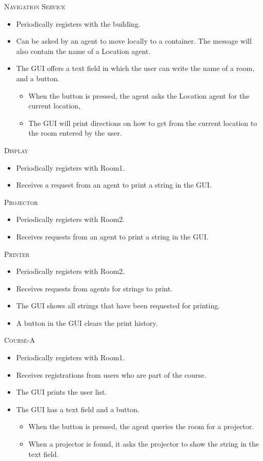 \documentclass[a4paper, 12pt, twoside]{article}
\begin{document}
\textsc{Navigation Service}
\begin{itemize}
	\item Periodically registers with the building.
	\item Can be asked by an agent to move locally to a container. The message will also contain the name of a Location agent.
	\item The GUI offers a text field in which the user can write the name of a room, and a button.
	\begin{itemize}
		\item When the button is pressed, the agent asks the Location agent for the current location,
		\item The GUI will print directions on how to get from the current location to the room entered by the user.
	\end{itemize}
\end{itemize}

\newpage

\textsc{Display}
\begin{itemize}
	\item Periodically registers with Room1.
	\item Receives a request from an agent to print a string in the GUI.
\end{itemize}


\textsc{Projector}
\begin{itemize}
	\item Periodically registers with Room2.
	\item Receives requests from an agent to print a string in the GUI.
\end{itemize}


\textsc{Printer}
\begin{itemize}
	\item Periodically registers with Room2.
	\item Receives requests from agents for strings to print.
	\item The GUI shows all strings that have been requested for printing.
	\item A button in the GUI clears the print history. 
\end{itemize}


\textsc{Course-A}
\begin{itemize}
	\item Periodically registers with Room1.
	\item Receives registrations from users who are part of the course.
	\item The GUI prints the user list.
	\item The GUI has a text field and a button.
	\begin{itemize}
		\item When the button is pressed, the agent queries the room for a projector.
		\item When a projector is found, it asks the projector to show the string in the text field.
	\end{itemize}
\end{itemize}
\end{document}
